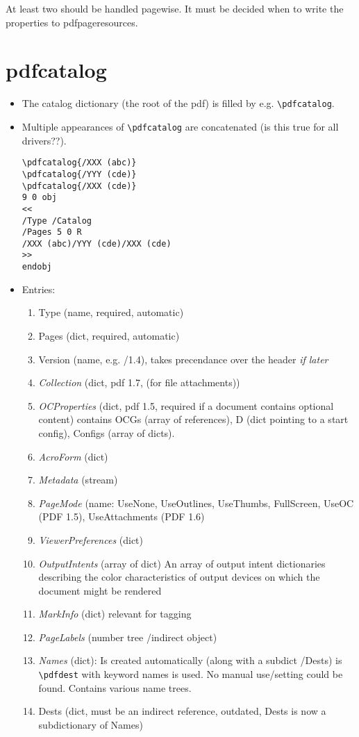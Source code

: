 \documentclass{article}
\begin{document}
At least two should be handled pagewise.
It must be decided when to write the properties to pdfpageresources.

\section{pdfcatalog}
\begin{itemize}
\item The catalog dictionary (the root of the pdf) is filled by e.g. \verb+\pdfcatalog+.
\item Multiple appearances of  \verb+\pdfcatalog+ are concatenated (is this true for all drivers??).

\begin{verbatim}
\pdfcatalog{/XXX (abc)}
\pdfcatalog{/YYY (cde)}
\pdfcatalog{/XXX (cde)}
9 0 obj
<<
/Type /Catalog
/Pages 5 0 R
/XXX (abc)/YYY (cde)/XXX (cde)
>>
endobj
\end{verbatim}

\item Entries:
\begin{enumerate}
  \item Type (name, required, automatic)
  \item Pages (dict, required, automatic)
  \item Version (name, e.g. /1.4), takes precendance over the header \emph{if later}
  \item \emph{Collection} (dict, pdf 1.7, (for file attachments))
  \item \emph{OCProperties} (dict, pdf 1.5, required if a document contains optional content)
        contains OCGs (array of references), D (dict pointing to a start config), Configs (array of dicts).
  \item \emph{AcroForm} (dict)
  \item \emph{Metadata} (stream)
  \item \emph{PageMode} (name: UseNone, UseOutlines, UseThumbs, FullScreen, UseOC (PDF 1.5),
   UseAttachments (PDF 1.6)
  \item \emph{ViewerPreferences} (dict)
  \item \emph{OutputIntents} (array of dict)
  An array of output intent dictionaries describing the color characteristics of output devices on which the document might be rendered
  \item \emph{MarkInfo} (dict) relevant for tagging
  \item \emph{PageLabels} (number tree /indirect object)
  \item \emph{Names} (dict): Is created automatically (along with a subdict /Dests) is \verb+\pdfdest+ with keyword names is used. No manual use/setting could be found. Contains various name trees.      
  \item Dests (dict, must be an indirect reference, outdated, Dests is now a subdictionary of Names)


\end{enumerate}
\end{itemize}
\end{document}
